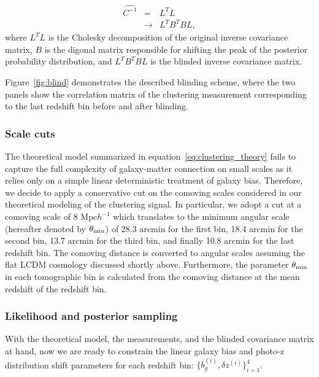 \documentclass[fleqn,usenatbib,useAMS]{mnras}
\begin{document}
\begin{eqnarray}
\widehat{C^{-1}} &=& L^{T}L \\
             &\rightarrow& L^{T}B^{T}BL, \label{eq:blinded}
\end{eqnarray}
where $L^{T}L$ is the Cholesky decomposition of the original inverse covariance matrix, $B$ is the digonal matrix responsible for shifting the peak of the posterior probability distribution, and $L^{T}B^{T}BL$ is the blinded inverse covariance matrix.

Figure~\ref{fig:blind} demonstrates the described blinding scheme, where the two panels show the correlation matrix of the clustering measurement corresponding to the last redshift bin before and after blinding.

\subsubsection{Scale cuts}\label{sec:scale_cut}

The theoretical model summarized in equation~\ref{eq:clustering_theory} fails to capture the full complexity of galaxy-matter connection on small scales as it relies only on a simple linear deterministic treatment of galaxy bias. Therefore, we decide to apply a conservative cut on the comoving scales considered in our theoretical modeling of the clustering signal. In particular, we adopt a cut at a comoving scale of 8 $\mathrm{Mpc}h^{-1}$ which translates to the minimum angular scale (hereafter denoted by $\theta_{\rm min}$) of 28.3 arcmin for the first bin, 18.4 arcmin for the second bin, 13.7 arcmin for the third bin, and finally 10.8 arcmin for the last redshift bin. The comoving distance is converted to angular scales assuming the flat LCDM cosmology discussed shortly above. Furthermore, the parameter $\theta_{\rm min}$ in each tomographic bin is calculated from the comoving distance at the mean redshift of the redshift bin.

 
 

\subsubsection{Likelihood and posterior sampling}

With the theoretical model, the measurements, and the blinded covariance matrix at hand, now we are ready to constrain the linear galaxy bias and photo-z distribution shift parameters for each redshift bin: $\{b_{g}^{(i)}, \delta z^{(i)}\}_{i=1}^{4}$. 
\end{document}
